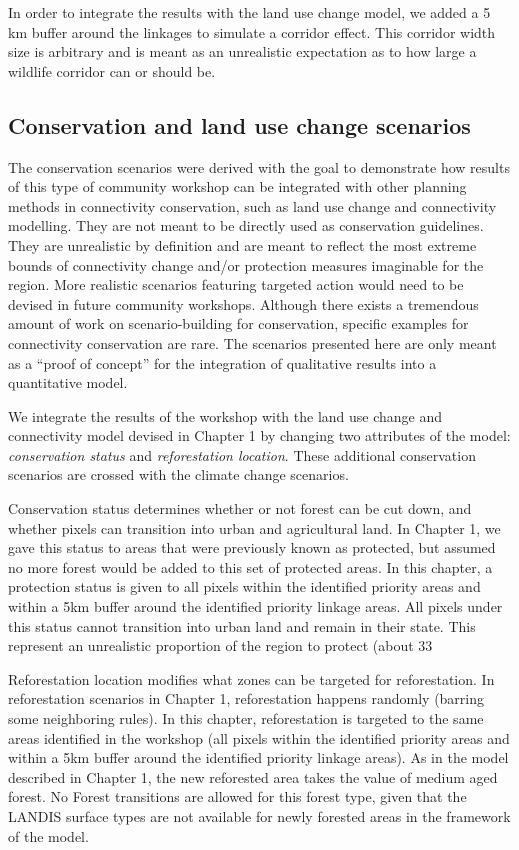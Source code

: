 In order to integrate the results with the land use change model, we added a 5 km buffer around the linkages to simulate a corridor effect. This corridor width size is arbitrary and is meant as an unrealistic expectation as to how large a wildlife corridor can or should be. \\

\subsection{Conservation and land use change scenarios}

The conservation scenarios were derived with the goal to demonstrate how results of this type of community workshop can be integrated with other planning methods in connectivity conservation, such as land use change and connectivity modelling. They are not meant to be directly used as conservation guidelines. They are unrealistic by definition and are meant to reflect the most extreme bounds of connectivity change and/or protection measures imaginable for the region. More realistic scenarios featuring targeted action would need to be devised in future community workshops. Although there exists a tremendous amount of work on scenario-building for conservation, specific examples for connectivity conservation are rare. The scenarios presented here are only meant as a “proof of concept” for the integration of qualitative results into a quantitative model. 

We integrate the results of the workshop with the land use change and connectivity model devised in Chapter 1 by changing two attributes of the model: \textit{conservation status} and \textit{reforestation location}. These additional conservation scenarios are crossed with the climate change scenarios.

Conservation status determines whether or not forest can be cut down, and whether pixels can transition into urban and agricultural land. In Chapter 1, we gave this status to areas that were previously known as protected, but assumed no more forest would be added to this set of protected areas. In this chapter, a protection status is given to all pixels within the identified priority areas and within a 5km buffer around the identified priority linkage areas. All pixels under this status cannot transition into urban land and remain in their state. This represent an unrealistic proportion of the region to protect (about 33%

Reforestation location modifies what zones can be targeted for reforestation. In reforestation scenarios in Chapter 1, reforestation happens randomly (barring some neighboring rules). In this chapter, reforestation is targeted to the same areas identified in the workshop (all pixels within the identified priority areas and within a 5km buffer around the identified priority linkage areas). As in the model described in Chapter 1, the new reforested area takes the value of medium aged forest. No Forest transitions are allowed for this forest type, given that the LANDIS surface types are not available for newly forested areas in the framework of the model. 

